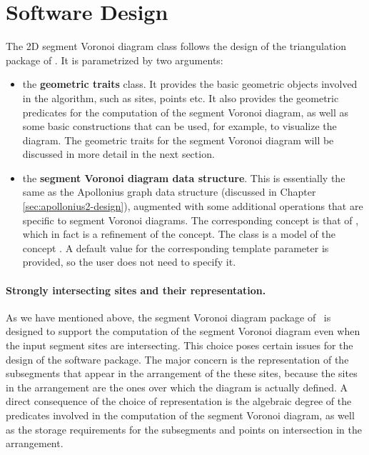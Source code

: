 \section{Software Design}
\label{sec:sdg2-design}

The 2D segment Voronoi diagram class
follows the design of the triangulation package of \cgal. It is
parametrized by two arguments:
\begin{itemize}
\item the {\bf geometric traits} class. It provides the basic
  geometric objects involved in the algorithm, such as sites, points
  etc. It also provides the geometric predicates for the computation
  of the segment Voronoi diagram, as well as some basic constructions
  that can be used, for example, to visualize the diagram.
  The geometric traits for the segment Voronoi diagram will be
  discussed in more detail in the next section.
\item the {\bf segment Voronoi diagram data structure}. This is
  essentially the same as the Apollonius graph data structure (discussed
  in Chapter \ref{sec:apollonius2-design}), augmented with some
  additional operations that are specific to segment Voronoi
  diagrams. The corresponding concept is that of
  , which in fact is a refinement
  of the  concept. The class
   is a model of
  the concept . A default value
  for the corresponding template parameter is provided, so the user
  does not need to specify it.
\end{itemize}


\paragraph{Strongly intersecting sites and their representation.}
As we have mentioned above, the segment Voronoi diagram package of
\cgal\ is designed to support the computation of the segment Voronoi
diagram even when the input segment sites are intersecting. This
choice poses certain issues for the design of the software
package. The major concern is the representation of the subsegments
that appear in the arrangement of the these sites, because the sites
in the arrangement are the ones over which the diagram is actually
defined. A direct consequence of the choice of representation is the
algebraic degree of the predicates involved in the computation of the
segment Voronoi diagram, as well as the storage requirements for the
subsegments and points on intersection in the arrangement.

